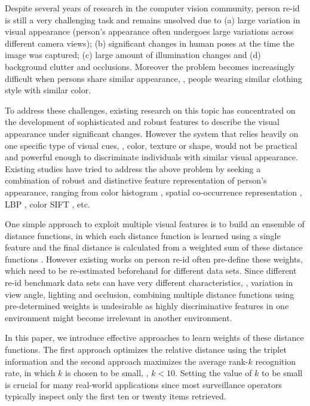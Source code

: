 \documentclass[10pt,twocolumn,letterpaper]{article}
\makeatletter
\renewcommand{\etc}{etc.}
\def\etc{etc.\@\xspace}
\makeatother
\begin{document}
Despite several years of research in the computer vision community,
person re-id is still a very challenging task and
remains unsolved due to (a) large variation in visual appearance
(person's appearance often undergoes large variations
across different camera views);
(b) significant changes in human poses
at the time the image was captured;
(c) large amount of illumination changes and
(d) background clutter and occlusions.
Moreover the problem becomes increasingly difficult when
persons share similar appearance, \eg,
people wearing similar
clothing style with similar color.




To address these challenges, existing research
on this topic
has concentrated on the development
of sophisticated and robust features to describe the visual appearance
under significant changes.
However the system that relies heavily on one specific type
of visual cues, \eg, color, texture or shape,
would not be practical and powerful enough to discriminate individuals with
similar visual appearance.
Existing studies have tried to address the above problem
by seeking a combination of robust and distinctive feature
representation of person's appearance,
ranging from color histogram \cite{Gray2008Viewpoint},
spatial co-occurrence representation \cite{Wang2007Shape},
LBP \cite{Xiong2014Person},
color SIFT \cite{Zhao2013Unsupervised}, \etc


One simple approach to exploit multiple visual features
is to build an ensemble of distance functions,
in which each distance function is learned using
a single feature
and the final distance is calculated from a weighted
sum of these distance functions
\cite{Farenzena2010Person,Xiong2014Person,Zhao2013Unsupervised}.
However existing works on person re-id often pre-define
these weights,
which need to be re-estimated
beforehand for different data sets.
Since different re-id benchmark data sets can have very different
characteristics, \ie, variation in view angle, lighting and occlusion,
combining multiple distance functions using pre-determined
weights is undesirable as highly discriminative features in one environment
might become irrelevant in another environment.


In this paper, we introduce effective approaches
to learn weights of these distance functions.
The first approach optimizes the relative distance using the triplet information
and the second approach maximizes the average
rank-$k$ recognition rate, in which $k$ is chosen to be small,
\eg, $k < 10$.
Setting the value of $k$ to be small is
crucial for many real-world applications since most surveillance
operators typically inspect only the first ten or twenty items retrieved.
\end{document}
